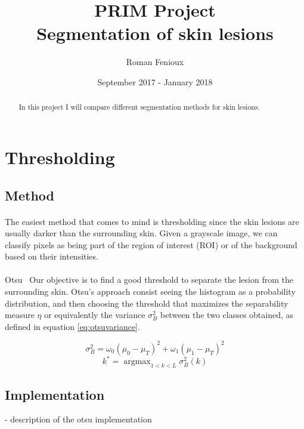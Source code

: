 \documentclass[a4paper,10pt]{article}
\title{PRIM Project\\ Segmentation of skin lesions}
\author{Roman Fenioux}
\date{September 2017 - January 2018}
\DeclareMathOperator*{\argmax}{argmax}
\begin{document}
\maketitle
\newpage
\begin{abstract}
In this project I will compare different segmentation methods for skin lesions. 
\end{abstract}


\section{Thresholding}
\subsection{Method}
\paragraph{}
The easiest method that comes to mind is thresholding since the skin lesions are 
usually darker than the surrounding skin. Given a grayscale image, we can 
classify pixels as being part of the region of interest (ROI) or of the 
background based on their intensities.
\paragraph{} Otsu~\cite{Otsu1979} 
Our objective is to find a good threshold to separate the lesion from the 
surrounding skin. Otsu's approach consist seeing the histogram as a probability 
distribution, and then choosing the threshold that maximizes the separability 
measure $\eta$ or equivalently the variance $\sigma_B^2$ between the two classes 
obtained, as defined in equation \ref{eq:otsuvariance}.

\begin{equation} \label{eq:otsuvariance}
  \sigma_B^2 = \omega_0 (\mu_0 - \mu_T)^2 + \omega_1 (\mu_1 - \mu_T)^2 
\end{equation}
\begin{equation} \label{eq:optimthresh}
  k^* = \argmax_{1<k<L} \sigma_B^2(k)   
\end{equation}

\subsection{Implementation}
- description of the otsu implementation
\end{document}
